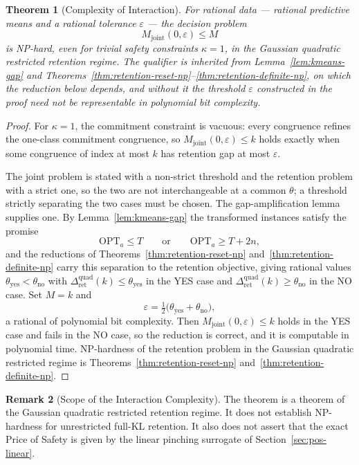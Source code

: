 \documentclass[12pt]{article}
\newtheorem{theorem}{Theorem}[section]
\theoremstyle{definition}
\newtheorem{remark}[theorem]{Remark}
\newcommand{\RetQuad}{\Delta_{\mathrm{ret}}^{\mathrm{quad}}}
\begin{document}
\begin{theorem}[Complexity of Interaction]
\label{thm:interaction-complexity}
For rational data --- rational predictive means and a rational tolerance
$\varepsilon$ --- the decision problem
\[
M_{\mathrm{joint}}(0,\varepsilon)\le M
\]
is NP-hard, even for trivial safety constraints $\kappa=1$, in the Gaussian
quadratic restricted retention regime.  The qualifier is inherited from
Lemma~\ref{lem:kmeans-gap} and
Theorems~\ref{thm:retention-reset-np}--\ref{thm:retention-definite-np}, on
which the reduction below depends, and without it the threshold
$\varepsilon$ constructed in the proof need not be representable in polynomial
bit complexity.
\end{theorem}

\begin{proof}
For $\kappa=1$, the commitment constraint is vacuous: every congruence refines
the one-class commitment congruence, so $M_{\mathrm{joint}}(0,\varepsilon)\le k$
holds exactly when some congruence of index at most $k$ has retention gap at
most $\varepsilon$.

The joint problem is stated with a non-strict threshold and the retention
problem with a strict one, so the two are not interchangeable at a common
$\theta$; a threshold strictly separating the two cases must be chosen.  The
gap-amplification lemma supplies one.  By Lemma~\ref{lem:kmeans-gap} the
transformed instances satisfy the promise
\[
\mathrm{OPT}_a\le T
\qquad\text{or}\qquad
\mathrm{OPT}_a\ge T+2n ,
\]
and the reductions of Theorems~\ref{thm:retention-reset-np}
and~\ref{thm:retention-definite-np} carry this separation to the retention
objective, giving rational values $\theta_{\mathrm{yes}}<\theta_{\mathrm{no}}$
with $\RetQuad(k)\le\theta_{\mathrm{yes}}$ in the YES case and
$\RetQuad(k)\ge\theta_{\mathrm{no}}$ in the NO case.  Set $M=k$ and
\[
\varepsilon=\tfrac12\bigl(\theta_{\mathrm{yes}}+\theta_{\mathrm{no}}\bigr),
\]
a rational of polynomial bit complexity.  Then
$M_{\mathrm{joint}}(0,\varepsilon)\le k$ holds in the YES case and fails in the
NO case, so the reduction is correct, and it is computable in polynomial time.
NP-hardness of the retention problem in the Gaussian quadratic restricted
regime is Theorems~\ref{thm:retention-reset-np}
and~\ref{thm:retention-definite-np}.
\end{proof}

\begin{remark}[Scope of the Interaction Complexity]
\label{rem:interaction-complexity-scope}
The theorem is a theorem of the Gaussian quadratic restricted retention regime.
It does not establish NP-hardness for unrestricted full-KL retention.  It also
does not assert that the exact Price of Safety is given by the linear pinching
surrogate of Section~\ref{sec:pos-linear}.
\end{remark}
\end{document}
